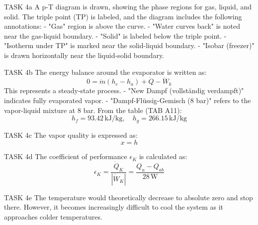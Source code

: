 TASK 4a  
A p-T diagram is drawn, showing the phase regions for gas, liquid, and solid. The triple point (TP) is labeled, and the diagram includes the following annotations:  
- "Gas" region is above the curve.  
- "Water curves back" is noted near the gas-liquid boundary.  
- "Solid" is labeled below the triple point.  
- "Isotherm under TP" is marked near the solid-liquid boundary.  
- "Isobar (freezer)" is drawn horizontally near the liquid-solid boundary.  

TASK 4b  
The energy balance around the evaporator is written as:  
\[
0 = \dot{m} (h_e - h_a) + \dot{Q} - \dot{W}_k
\]  
This represents a steady-state process.  
- "New Dampf (vollständig verdampft)" indicates fully evaporated vapor.  
- "Dampf-Flüssig-Gemisch (8 bar)" refers to the vapor-liquid mixture at 8 bar.  
From the table (TAB A11):  
\[
h_f = 93.42 \, \text{kJ/kg}, \quad h_g = 266.15 \, \text{kJ/kg}
\]  

TASK 4c  
The vapor quality is expressed as:  
\[
x = h
\]  

TASK 4d  
The coefficient of performance \( \epsilon_K \) is calculated as:  
\[
\epsilon_K = \frac{\dot{Q}_K}{|\dot{W}_K|} = \frac{Q_u - Q_{ab}}{28 \, \text{W}}
\]  

TASK 4e  
The temperature would theoretically decrease to absolute zero and stop there. However, it becomes increasingly difficult to cool the system as it approaches colder temperatures.